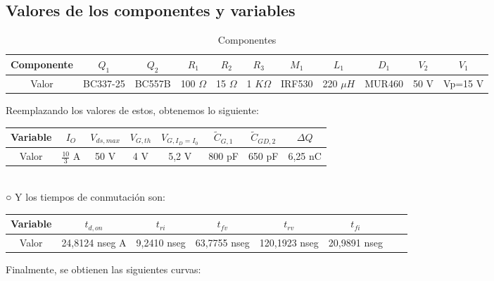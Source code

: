 \documentclass[e4_tp1_main.tex]{subfiles}
\begin{document}
\subsection{Valores de los componentes y variables}
\begin{table}[H]
\begin{tabular}{|c|c|c|c|c|c|c|c|c|c|c|}
\hline
Componente & $Q_1$ & $Q_2$ & $R_1$ & $R_2$ & $R_3$ & $M_1$ & $L_1$ & $D_1$ & $V_2$ & $V_1$\\
\hline
Valor & BC337-25 & BC557B & 100 $\Omega$ & 15 $\Omega$ & 1 $K\Omega$ & IRF530 & 220 $\mu H$ & MUR460 & 50 V & Vp=15 V\\
\hline
\end{tabular}
\caption{Componentes}
\end{table}
Reemplazando los valores de estos, obtenemos lo siguiente:\\
\begin{tabular}{|c|c|c|c|c|c|c|c|}
\hline
Variable & $I_O$ & $V_{ds,max}$ & $V_{G,th}$ & $V_{G,I_D=I_0}$ & $\tilde{C}_{G,1}$ & $\tilde{C}_{GD,2}$ & $\Delta Q$  \\
\hline
Valor & $\frac{10}{3}$ A & 50 V & 4 V & 5,2 V & 800 pF & 650 pF & 6,25 nC\\
\hline
\end{tabular}\\○
Y los tiempos de conmutación son:\\
\begin{tabular}{|c|c|c|c|c|c|c|c|}
\hline
Variable & $t_{d,on}$ & $t_{ri}$ & $t_{fv}$ & $t_{rv}$ & $t_{fi}$  \\
\hline
Valor & 24,8124 nseg A & 9,2410 nseg & 63,7755 nseg & 120,1923 nseg & 20,9891 nseg\\
\hline
\end{tabular}

Finalmente, se obtienen las siguientes curvas:
\end{document}
